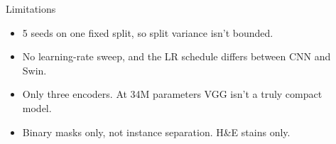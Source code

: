 \documentclass[final]{beamer}
\newlength{\sepwidth}
\newlength{\colwidth}
\newcommand{\separatorcolumn}{\begin{column}{\sepwidth}\end{column}}
\begin{document}
\begin{frame}[t]
\begin{columns}[t]
\begin{column}{\colwidth}
  \begin{block}{Limitations}
    \begin{itemize}
      \item 5 seeds on one fixed split, so split variance isn't bounded.
      \item No learning-rate sweep, and the LR schedule differs between CNN and Swin.
      \item Only three encoders. At 34M parameters VGG isn't a truly compact model.
      \item Binary masks only, not instance separation. H\&E stains only.
    \end{itemize}
  \end{block}



\end{column}

\separatorcolumn

\begin{column}{\colwidth}


\end{column}
\end{columns}
\end{frame}
\end{document}
